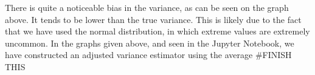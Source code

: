 There is quite a noticeable bias in the variance, as can be seen on the graph above. It tends to be lower than the true variance. This is likely due to the fact that we have used the normal distribution, in which extreme values are extremely uncommon. In the graphs given above, and seen in the Jupyter Notebook, we have constructed an adjusted variance estimator using the average \#FINISH THIS